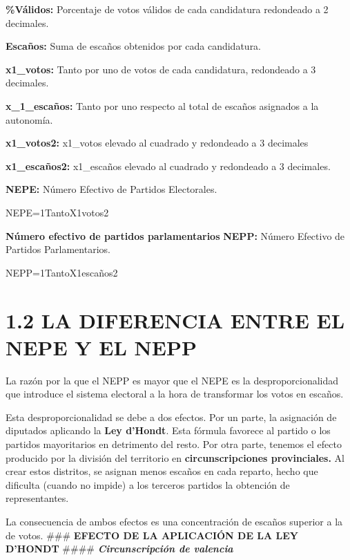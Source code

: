 \documentclass[
]{article}
\begin{document}
\textbf{\%Válidos:} Porcentaje de votos válidos de cada candidatura
redondeado a 2 decimales.

\textbf{Escaños:} Suma de escaños obtenidos por cada candidatura.

\textbf{x1\_votos:} Tanto por uno de votos de cada candidatura,
redondeado a 3 decimales.

\textbf{x\_1\_escaños:} Tanto por uno respecto al total de escaños
asignados a la autonomía.

\textbf{x1\_votos2:} x1\_votos elevado al cuadrado y redondeado a 3
decimales

\textbf{x1\_escaños2:} x1\_escaños elevado al cuadrado y redondeado a 3
decimales.

\textbf{NEPE:} Número Efectivo de Partidos Electorales.

NEPE=1TantoX1votos2

\textbf{Número efectivo de partidos parlamentarios} \textbf{NEPP:}
Número Efectivo de Partidos Parlamentarios.

NEPP=1TantoX1escaños2

\hypertarget{la-diferencia-entre-el-nepe-y-el-nepp}{%
\section{1.2 LA DIFERENCIA ENTRE EL NEPE Y EL
NEPP}\label{la-diferencia-entre-el-nepe-y-el-nepp}}

La razón por la que el NEPP es mayor que el NEPE es la
desproporcionalidad que introduce el sistema electoral a la hora de
transformar los votos en escaños.

Esta desproporcionalidad se debe a dos efectos. Por un parte, la
asignación de diputados aplicando la \textbf{Ley d'Hondt}. Esta fórmula
favorece al partido o los partidos mayoritarios en detrimento del resto.
Por otra parte, tenemos el efecto producido por la división del
territorio en \textbf{circunscripciones provinciales.} Al crear estos
distritos, se asignan menos escaños en cada reparto, hecho que dificulta
(cuando no impide) a los terceros partidos la obtención de
representantes.

La consecuencia de ambos efectos es una concentración de escaños
superior a la de votos. \#\#\# \textbf{EFECTO DE LA APLICACIÓN DE LA LEY
D'HONDT} \#\#\#\# \textbf{\emph{Circunscripción de valencia}}
\end{document}
